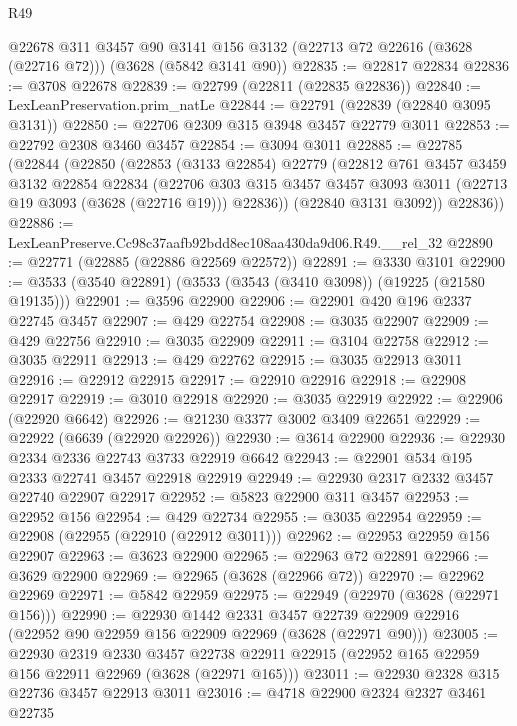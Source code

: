 \begin{lexlean}{R49}
\begin{coremodule}
    @22678
    @311
    @3457
    @90
    @3141
    @156
    @3132
    (@22713 @72 @22616 (@3628 (@22716 @72)))
    (@3628 (@5842 @3141 @90))
@22835 := @22817 @22834
@22836 := @3708 @22678
@22839 := @22799 (@22811 (@22835 @22836))
@22840 := LexLeanPreservation.prim_natLe
@22844 := @22791 (@22839 (@22840 @3095 @3131))
@22850 := @22706 @2309 @315 @3948 @3457 @22779 @3011
@22853 := @22792 @2308 @3460 @3457
@22854 := @3094 @3011
@22885 := @22785
    (@22844
      (@22850
        (@22853
          (@3133 @22854)
          @22779
          (@22812
            @761
            @3457
            @3459
            @3132
            @22854
            @22834
            (@22706
              @303
              @315
              @3457
              @3457
              @3093
              @3011
              (@22713 @19 @3093 (@3628 (@22716 @19)))
              @22836))
          (@22840 @3131 @3092))
        @22836))
@22886 := LexLeanPreserve.Cc98c37aafb92bdd8ec108aa430da9d06.R49.__rel_32
@22890 := @22771 (@22885 (@22886 @22569 @22572))
@22891 := @3330 @3101
@22900 := @3533 (@3540 @22891) (@3533 (@3543 (@3410 @3098)) (@19225 (@21580 @19135)))
@22901 := @3596 @22900
@22906 := @22901 @420 @196 @2337 @22745 @3457
@22907 := @429 @22754
@22908 := @3035 @22907
@22909 := @429 @22756
@22910 := @3035 @22909
@22911 := @3104 @22758
@22912 := @3035 @22911
@22913 := @429 @22762
@22915 := @3035 @22913 @3011
@22916 := @22912 @22915
@22917 := @22910 @22916
@22918 := @22908 @22917
@22919 := @3010 @22918
@22920 := @3035 @22919
@22922 := @22906 (@22920 @6642)
@22926 := @21230 @3377 @3002 @3409 @22651
@22929 := @22922 (@6639 (@22920 @22926))
@22930 := @3614 @22900
@22936 := @22930 @2334 @2336 @22743 @3733 @22919 @6642
@22943 := @22901 @534 @195 @2333 @22741 @3457 @22918 @22919
@22949 := @22930 @2317 @2332 @3457 @22740 @22907 @22917
@22952 := @5823 @22900 @311 @3457
@22953 := @22952 @156
@22954 := @429 @22734
@22955 := @3035 @22954
@22959 := @22908 (@22955 (@22910 (@22912 @3011)))
@22962 := @22953 @22959 @156 @22907
@22963 := @3623 @22900
@22965 := @22963 @72 @22891
@22966 := @3629 @22900
@22969 := @22965 (@3628 (@22966 @72))
@22970 := @22962 @22969
@22971 := @5842 @22959
@22975 := @22949 (@22970 (@3628 (@22971 @156)))
@22990 := @22930
    @1442
    @2331
    @3457
    @22739
    @22909
    @22916
    (@22952 @90 @22959 @156 @22909 @22969 (@3628 (@22971 @90)))
@23005 := @22930
    @2319
    @2330
    @3457
    @22738
    @22911
    @22915
    (@22952 @165 @22959 @156 @22911 @22969 (@3628 (@22971 @165)))
@23011 := @22930 @2328 @315 @22736 @3457 @22913 @3011
@23016 := @4718 @22900 @2324 @2327 @3461 @22735

\end{coremodule}
\end{lexlean}
